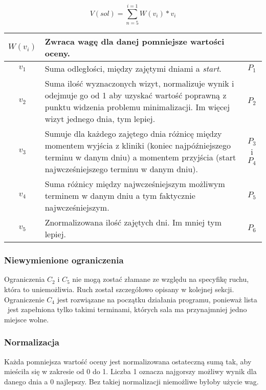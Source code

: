 \begin{equation}
	V(sol) = \sum_{n=5}^{i=1} W(v_i) * v_i
\end{equation}

\begin{table}[h]
	\begin{tabularx}{\textwidth}{ | C{0.4} | L{2.3} | C{0.3} | }
		\hline
		$W(v_i)$ &  Zwraca wagę dla danej pomniejsze wartości oceny. &  \\
		\hline
		$v_1$ & Suma odległości, między zajętymi dniami a \emph{start}.& $P_1$\\
		\hline
		$v_2$ & Suma ilość wyznaczonych
		wizyt, normalizuje wynik i odejmuje go od 1 aby uzyskać wartość
		poprawną z punktu widzenia problemu minimalizacji. Im więcej
		wizyt jednego dnia, tym lepiej. &
		$P_2$\\
		\hline
		$v_3$ & Sumuje dla każdego zajętego dnia różnicę między momentem wyjścia z
		kliniki (koniec najpóźniejszego terminu w danym dniu) a momentem
		przyjścia (start najwcześniejszego terminu w danym
		dniu). & $P_3$ i $P_4$ \\
		\hline
		$v_4$ & Suma różnicy między
		najwcześniejszym możliwym terminem w danym dniu a tym faktycznie
		najwcześniejszym. & $P_5$\\
		\hline
		$v_5$ & Znormalizowana ilość zajętych dni. Im mniej tym lepiej. & $P_6$\\
		\hline
\end{tabularx}
\end{table}


\subsubsection{Niewymienione ograniczenia}
Ograniczenia $C_2$ i $C_5$ nie mogą zostać złamane ze względu na specyfikę
ruchu, która to uniemożliwia. Ruch został szczegółowo opisany w kolejnej sekcji.
Ograniczenie $C_4$ jest rozwiązane na początku działania programu, ponieważ
lista \sTermsList\ jest zapełniona tylko takimi terminami, których sala ma
przynajmniej jedno miejsce wolne.

\subsubsection{Normalizacja} 
Każda pomniejsza wartość oceny jest normalizowana ostateczną sumą tak, aby mieściła się w
zakresie od 0 do 1. Liczba 1 oznacza najgorszy możliwy wynik dla
danego dnia a 0 najlepszy. Bez takiej normalizacji niemożliwe byłoby użycie wag.

